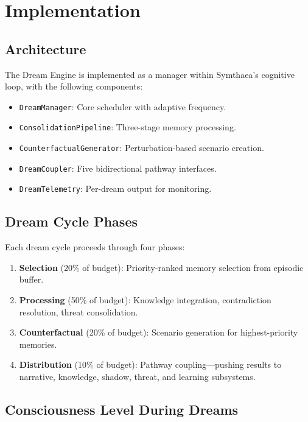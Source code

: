 \documentclass[11pt,a4paper]{article}
\begin{document}
\section{Implementation}

\subsection{Architecture}

The Dream Engine is implemented as a manager within Symthaea's cognitive loop, with the following components:

\begin{itemize}[nosep]
    \item \texttt{DreamManager}: Core scheduler with adaptive frequency.
    \item \texttt{ConsolidationPipeline}: Three-stage memory processing.
    \item \texttt{CounterfactualGenerator}: Perturbation-based scenario creation.
    \item \texttt{DreamCoupler}: Five bidirectional pathway interfaces.
    \item \texttt{DreamTelemetry}: Per-dream output for monitoring.
\end{itemize}

\subsection{Dream Cycle Phases}

Each dream cycle proceeds through four phases:

\begin{enumerate}[nosep]
    \item \textbf{Selection} (20\% of budget): Priority-ranked memory selection from episodic buffer.
    \item \textbf{Processing} (50\% of budget): Knowledge integration, contradiction resolution, threat consolidation.
    \item \textbf{Counterfactual} (20\% of budget): Scenario generation for highest-priority memories.
    \item \textbf{Distribution} (10\% of budget): Pathway coupling---pushing results to narrative, knowledge, shadow, threat, and learning subsystems.
\end{enumerate}

\subsection{Consciousness Level During Dreams}
\end{document}
